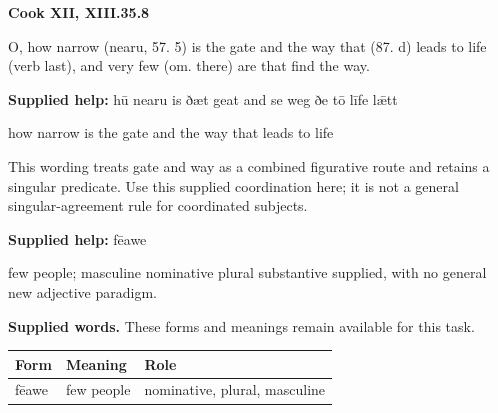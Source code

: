 \par\begin{minipage}{\linewidth}\raggedright
\textbf{Cook XII, XIII.35.8}

O, how narrow (nearu, 57. 5) is the gate and the way that (87. d) leads to life (verb last), and very few (om. there) are that find the way.

\textbf{Supplied help:} hū nearu is ðæt geat and se weg ðe tō līfe lǣtt

how narrow is the gate and the way that leads to life

This wording treats gate and way as a combined figurative route and retains a singular predicate. Use this supplied coordination here; it is not a general singular-agreement rule for coordinated subjects.

\textbf{Supplied help:} fēawe

few people; masculine nominative plural substantive supplied, with no general new adjective paradigm.

\end{minipage}\par\addvspace{4pt}

\textbf{Supplied words.} These forms and meanings remain available for this task.

\par\begingroup
\fontsize{10.5}{13.2}\selectfont
\setlength{\LTleft}{0pt}\setlength{\LTright}{\fill}
\noindent
\begin{tabular}{@{}>{\raggedright\arraybackslash}p{30.28mm}>{\raggedright\arraybackslash}p{30.28mm}>{\raggedright\arraybackslash}p{57.83mm}@{}}
\toprule
\textbf{Form} & \textbf{Meaning} & \textbf{Role} \\
\midrule
fēawe & few people & nominative, plural, masculine \\
\bottomrule
\end{tabular}
\par\endgroup

